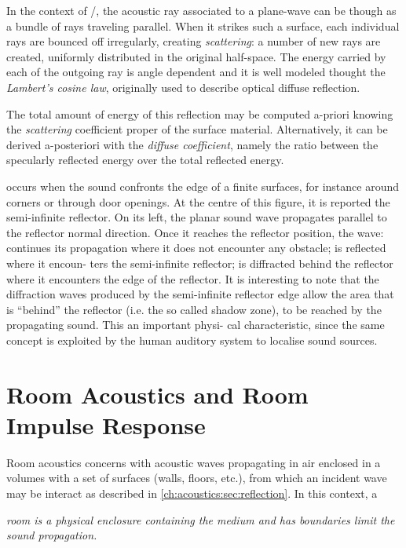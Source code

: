 In the context of \GA/, the acoustic ray associated to a plane-wave can be though as a bundle of rays traveling parallel.
When it strikes such a surface, each individual rays are bounced off irregularly, creating \textit{scattering}:
a number of new rays are created, uniformly distributed in the original half-space.
The energy carried by each of the outgoing ray is angle dependent and it
is well modeled thought the \textit{Lambert's cosine law}, originally used to describe optical diffuse reflection.

The total amount of energy of this reflection may be computed a-priori
knowing the \textit{scattering} coefficient proper of the surface material.
Alternatively, it can be derived a-posteriori with the \textit{diffuse coefficient}, namely the ratio between
the specularly reflected energy over the total reflected energy.

 occurs when the sound confronts the edge of a finite surfaces, for instance around corners or through door openings.
At the centre of this figure, it is reported the semi-infinite reflector. On its left, the planar sound wave propagates parallel to the reflector normal direction. Once it reaches the reflector position, the wave: continues its propagation where it does not encounter any obstacle; is reflected where it encoun- ters the semi-infinite reflector; is diffracted behind the reflector where it encounters the edge of the reflector. It is interesting to note that the diffraction waves produced by the semi-infinite reflector edge allow the area that is “behind” the reflector (i.e. the so called shadow zone), to be reached by the propagating sound. This an important physi- cal characteristic, since the same concept is exploited by the human auditory system to localise sound sources.


\section{Room Acoustics and Room Impulse Response}\label{ch:acoustics:sec:rir}
Room acoustics concerns with acoustic waves propagating in air enclosed in a volumes with a set of surfaces
(walls, floors, etc.), from which an incident wave may be interact as described in \cref{ch:acoustics:sec:reflection}.
In this context, a
\begin{center}
    \textit{\emph{room} is a physical enclosure containing the medium and has boundaries limit the sound propagation.}
\end{center}

